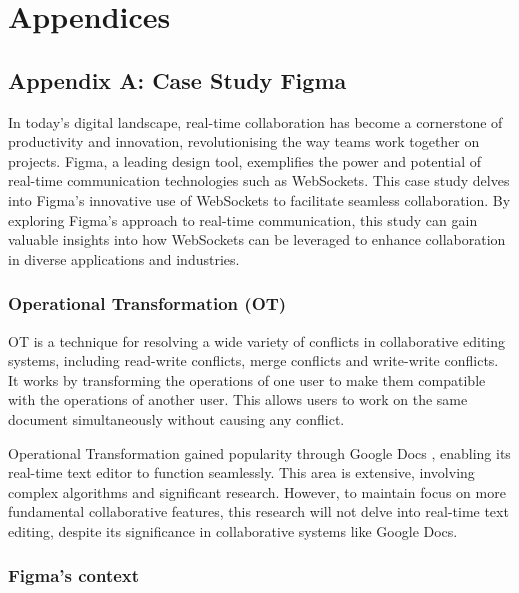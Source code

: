 \newpage

\section*{Appendices}

\subsection*{Appendix A: Case Study Figma}

In today's digital landscape, real-time collaboration has become a cornerstone of productivity and innovation, revolutionising the way teams work together on projects. Figma, a leading design tool, exemplifies the power and potential of real-time communication technologies such as WebSockets. This case study delves into Figma's innovative use of WebSockets to facilitate seamless collaboration. By exploring Figma's approach to real-time communication, this study can gain valuable insights into how WebSockets can be leveraged to enhance collaboration in diverse applications and industries.

\subsubsection*{Operational Transformation (OT)}

OT is a technique for resolving a wide variety of conflicts in collaborative editing systems, including read-write conflicts, merge conflicts and write-write conflicts. It works by transforming the operations of one user to make them compatible with the operations of another user. This allows users to work on the same document simultaneously without causing any conflict. \cite{ot}

Operational Transformation gained popularity through Google Docs \cite{figma-rtc}, enabling its real-time text editor to function seamlessly. This area is extensive, involving complex algorithms and significant research. However, to maintain focus on more fundamental collaborative features, this research will not delve into real-time text editing, despite its significance in collaborative systems like Google Docs.

\subsubsection*{Figma's context}

